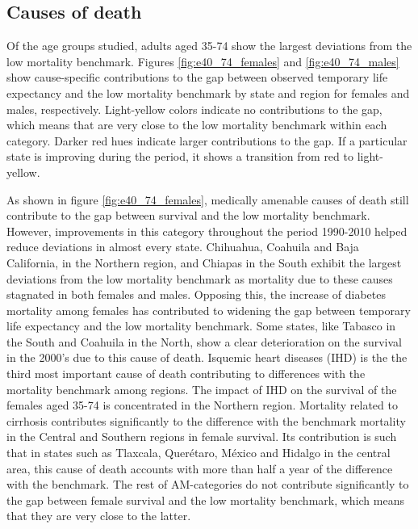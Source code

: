 \documentclass[11.5pt]{article}
\begin{document}
\begin{spacing}{1.5}


\subsection*{Causes of death}

Of the age groups studied, adults aged 35-74 show the largest deviations from the low mortality benchmark. Figures  \ref{fig:e40_74_females} and \ref{fig:e40_74_males} show cause-specific contributions to the gap between observed temporary life expectancy and the low mortality benchmark by state and region for females and males, respectively. Light-yellow colors indicate no contributions to the gap, which means that are very close to the low mortality benchmark within each category. Darker red hues indicate larger contributions to the gap. If a particular state is improving during the period, it shows a transition from red to light-yellow. 

As shown in figure \ref{fig:e40_74_females}, medically amenable causes of death still contribute to the gap between survival and the low mortality benchmark. However, improvements in this category throughout the period 1990-2010 helped reduce deviations in almost every state. Chihuahua, Coahuila and Baja California, in the Northern region, and Chiapas in the South exhibit the largest deviations from the low mortality benchmark as mortality due to these causes stagnated in both females and males. Opposing this, the increase of diabetes mortality among females has contributed to widening the gap between temporary life expectancy and the low mortality benchmark. Some states, like Tabasco in the South and Coahuila in the North, show a clear deterioration on the survival in the 2000's due to this cause of death. Isquemic heart diseases (IHD) is the the third most important cause of death contributing to differences with the mortality benchmark among regions. The impact of IHD on the survival of the females aged 35-74 is concentrated in the Northern region. Mortality related to cirrhosis contributes significantly to the difference with the benchmark mortality in the Central and Southern regions in female survival. Its contribution is such that in states such as Tlaxcala, Quer\'etaro, M\'exico and Hidalgo in the central area, this cause of death accounts with more than half a year of the difference with the benchmark. The rest of AM-categories do not contribute significantly to the gap between female survival and the low mortality benchmark, which means that they are very close to the latter.


\end{spacing}
\end{document}
